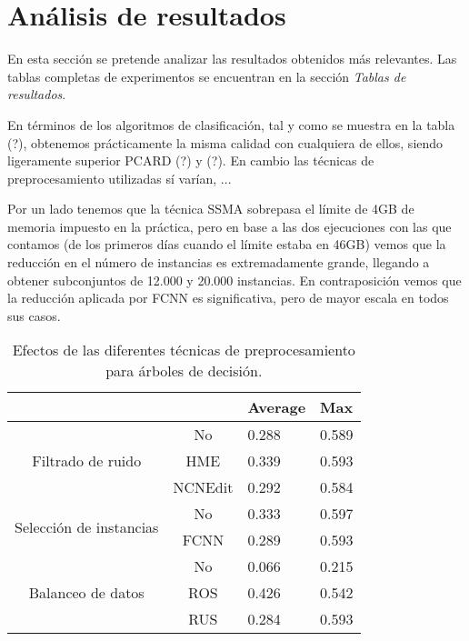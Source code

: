 \section{Análisis de resultados}

En esta sección se pretende analizar las resultados obtenidos más relevantes. Las tablas completas de experimentos se encuentran en la sección \textit{Tablas de resultados}.


En términos de los algoritmos de clasificación, tal y como se muestra en la tabla (?), obtenemos prácticamente la misma calidad con cualquiera de ellos, siendo ligeramente superior PCARD (?) y (?). En cambio las técnicas de preprocesamiento utilizadas sí varían, ...

Por un lado tenemos que la técnica SSMA sobrepasa el límite de 4GB de memoria impuesto en la práctica, pero en base a las dos ejecuciones con las que contamos (de los primeros días cuando el límite estaba en 46GB) vemos que la reducción en el número de instancias es extremadamente grande, llegando a obtener subconjuntos de 12.000 y 20.000 instancias.
En contraposición vemos que la reducción aplicada por FCNN es significativa, pero de mayor escala en todos sus casos.

\begin{table}[]
    \centering
    \begin{tabular}{cc|l|l|}
    \cline{3-4}
    \multicolumn{1}{l}{\textbf{}} & \textbf{} & \multicolumn{1}{c|}{\textbf{Average}} & \textbf{Max} \\ \hline
    \multicolumn{1}{|c|}{\multirow{3}{*}{Filtrado de ruido}}       & No        & 0.288    & 0.589    \\ \cline{2-4} 
    \multicolumn{1}{|c|}{}  & HME       & 0.339         & 0.593        \\ \cline{2-4} 
    \multicolumn{1}{|c|}{}  & NCNEdit   & 0.292         & 0.584        \\ \hline
    \multicolumn{1}{|c|}{\multirow{2}{*}{Selección de instancias}} & No        & 0.333         & 0.597        \\ \cline{2-4} 
    \multicolumn{1}{|c|}{}  & FCNN      & 0.289         & 0.593        \\ \hline
    \multicolumn{1}{|c|}{\multirow{3}{*}{Balanceo de datos}}       & No        & 0.066         & 0.215        \\ \cline{2-4} 
    \multicolumn{1}{|c|}{}  & ROS       & 0.426         & 0.542        \\ \cline{2-4} 
    \multicolumn{1}{|c|}{}  & RUS       & 0.284         & 0.593        \\ \hline
    \end{tabular}
    \caption{Efectos de las diferentes técnicas de preprocesamiento para árboles de decisión.}
\end{table}

